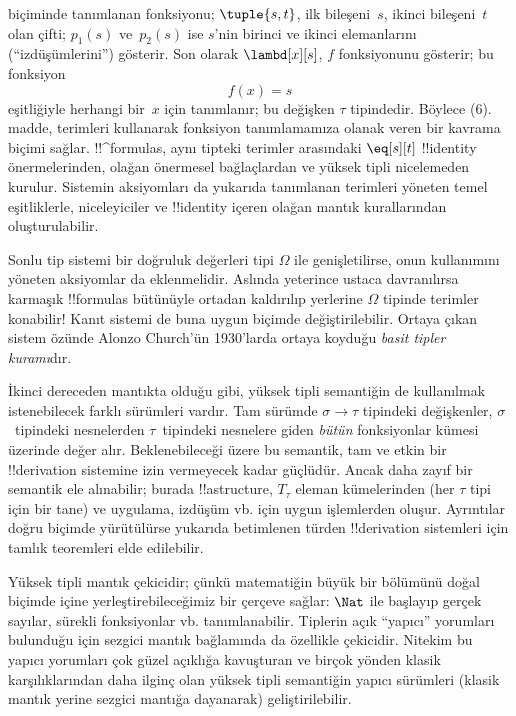 \documentclass[../../../include/open-logic-section]{subfiles}
\begin{document}
biçiminde tanımlanan fonksiyonu; $\tuple{s, t}$, ilk bileşeni~$s$, ikinci
bileşeni~$t$ olan çifti; $p_1(s)$ ve~$p_2(s)$ ise $s$'nin birinci ve ikinci
elemanlarını (``izdüşümlerini'') gösterir. Son olarak $\lambd[x][s]$, $f$
fonksiyonunu gösterir; bu fonksiyon
\[
f(x) = s
\]
eşitliğiyle herhangi bir~$x$ için tanımlanır; bu değişken $\tau$ tipindedir.
Böylece (6).
madde, terimleri
kullanarak fonksiyon tanımlamamıza olanak veren bir kavrama biçimi sağlar.
!!^{formula}s, aynı tipteki terimler arasındaki $\eq[s][t]$ !!{identity}
önermelerinden, olağan önermesel bağlaçlardan ve yüksek tipli nicelemeden
kurulur. Sistemin aksiyomları da yukarıda tanımlanan terimleri yöneten temel
eşitliklerle, niceleyiciler ve !!{identity} içeren olağan mantık kurallarından
oluşturulabilir.

Sonlu tip sistemi bir doğruluk değerleri tipi $\Omega$ ile genişletilirse,
onun kullanımını yöneten aksiyomlar da eklenmelidir. Aslında yeterince ustaca
davranılırsa karmaşık !!{formula}s bütünüyle ortadan kaldırılıp yerlerine
$\Omega$ tipinde terimler konabilir!{} Kanıt sistemi de buna uygun biçimde
değiştirilebilir. Ortaya çıkan sistem özünde Alonzo Church'ün 1930'larda ortaya
koyduğu \emph{basit tipler kuramı}dır.

İkinci dereceden mantıkta olduğu gibi, yüksek tipli semantiğin de kullanılmak
istenebilecek farklı sürümleri vardır. Tam sürümde $\sigma \to \tau$ tipindeki
değişkenler, $\sigma$~tipindeki nesnelerden $\tau$~tipindeki nesnelere giden
\emph{bütün} fonksiyonlar kümesi üzerinde değer alır. Beklenebileceği üzere bu
semantik, tam ve etkin bir !!{derivation} sistemine izin vermeyecek kadar
güçlüdür. Ancak daha zayıf bir semantik ele alınabilir; burada !!a{structure},
$T_\tau$ eleman kümelerinden (her $\tau$ tipi için bir tane) ve uygulama,
izdüşüm vb. için uygun işlemlerden oluşur. Ayrıntılar doğru biçimde yürütülürse
yukarıda
betimlenen türden !!{derivation} sistemleri için tamlık teoremleri elde
edilebilir.

Yüksek tipli mantık çekicidir; çünkü matematiğin büyük bir bölümünü doğal
biçimde içine yerleştirebileceğimiz bir çerçeve sağlar: $\Nat$ ile başlayıp
gerçek sayılar, sürekli fonksiyonlar vb. tanımlanabilir. Tiplerin açık
``yapıcı'' yorumları bulunduğu için sezgici mantık bağlamında da özellikle
çekicidir. Nitekim bu yapıcı yorumları çok güzel açıklığa kavuşturan ve birçok
yönden klasik karşılıklarından daha ilginç olan yüksek tipli semantiğin yapıcı
sürümleri (klasik mantık yerine sezgici mantığa dayanarak) geliştirilebilir.
\end{document}

